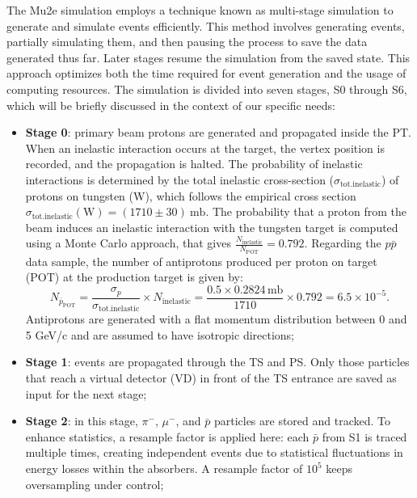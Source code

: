 The Mu2e simulation employs a technique known as multi-stage simulation 
to generate and simulate events efficiently. This method involves generating 
events, partially simulating them, and then pausing the process to save the 
data generated thus far. Later stages resume the simulation from the saved 
state. This approach optimizes both the time required for event generation 
and the usage of computing resources. The simulation is divided into seven 
stages, S0 through S6, which will be briefly discussed in the context of our specific needs:

\begin{itemize}
    \item \textbf{Stage 0}: primary beam protons are generated and propagated 
    inside the PT. When an inelastic interaction occurs at the target, the vertex 
    position is recorded, and the propagation is halted. The probability of 
    inelastic interactions is determined by the total inelastic cross-section 
    ($\sigma_{\text{tot.inelastic}}$) of protons on tungsten (W), which follows the 
    empirical cross section $\sigma_{\text{tot.inelastic}}(\text{W}) = (1710 \pm 30) \ \text{mb}$.
    The probability that a proton from the beam induces an inelastic interaction 
    with the tungsten target is computed using a Monte Carlo approach, that gives 
    $    \frac{N_{\text{inelastic}}}{N_{\text{POT}}} = 0.792$. Regarding the $p\bar{p}$ 
    data sample, the number of antiprotons produced per proton on target (POT) at the production target is given by:
    $$
    N_{\bar{p}_{\text{POT}}} = \frac{\sigma_p}{\sigma_{\text{tot.inelastic}}} \times N_{\text{inelastic}} = \frac{0.5 \times 0.2824 \, \text{mb}}{1710} \times 0.792 = 6.5 \times 10^{-5}.
    $$
    Antiprotons are generated with a flat momentum distribution between 0 and 5 GeV/c and 
    are assumed to have isotropic directions;
    
    \item \textbf{Stage 1}: events are propagated through the TS and PS. 
    Only those particles that reach a virtual detector (VD) in front 
    of the TS entrance are saved as input for the next stage;

    \item \textbf{Stage 2}: in this stage, $\pi^-$, $\mu^-$, and $\bar{p}$ 
    particles are stored and tracked. To enhance statistics, a resample factor 
    is applied here: each $\bar{p}$ from S1 is traced multiple times, creating 
    independent events due to statistical fluctuations in energy losses within 
    the absorbers. A resample factor of $10^5$ keeps oversampling under control;


\end{itemize}
